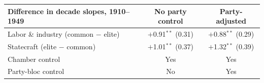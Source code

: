 \begin{tabular}{lcc}
\toprule
Difference in decade slopes, 1910--1949 & No party control & Party-adjusted \\
\midrule
Labor \& industry (common $-$ elite) & $+$0.91$^{**}$ (0.31) & $+$0.88$^{**}$ (0.29) \\
Statecraft (elite $-$ common) & $+$1.01$^{**}$ (0.37) & $+$1.32$^{**}$ (0.39) \\
\midrule
Chamber control & Yes & Yes \\
Party-bloc control & No & Yes \\
\bottomrule
\end{tabular}
